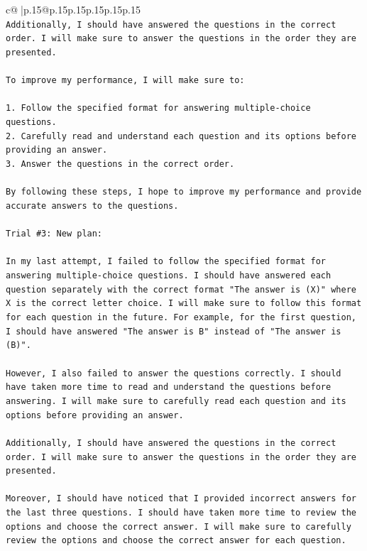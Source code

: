 \documentclass{article}
\begin{document}
{\begin{supertabular}{c@{$\;$}|p{.15\linewidth}@{}p{.15\linewidth}p{.15\linewidth}p{.15\linewidth}p{.15\linewidth}p{.15\linewidth}}
{{{\\ 
\texttt{Additionally, I should have answered the questions in the correct order. I will make sure to answer the questions in the order they are presented.} \\
\\ 
\texttt{To improve my performance, I will make sure to:} \\
\\ 
\texttt{1. Follow the specified format for answering multiple{-}choice questions.} \\
\texttt{2. Carefully read and understand each question and its options before providing an answer.} \\
\texttt{3. Answer the questions in the correct order.} \\
\\ 
\texttt{By following these steps, I hope to improve my performance and provide accurate answers to the questions.} \\
\\ 
\texttt{Trial \#3: New plan: } \\
\\ 
\texttt{In my last attempt, I failed to follow the specified format for answering multiple{-}choice questions. I should have answered each question separately with the correct format "The answer is (X)" where X is the correct letter choice. I will make sure to follow this format for each question in the future. For example, for the first question, I should have answered "The answer is B" instead of "The answer is (B)".} \\
\\ 
\texttt{However, I also failed to answer the questions correctly. I should have taken more time to read and understand the questions before answering. I will make sure to carefully read each question and its options before providing an answer.} \\
\\ 
\texttt{Additionally, I should have answered the questions in the correct order. I will make sure to answer the questions in the order they are presented.} \\
\\ 
\texttt{Moreover, I should have noticed that I provided incorrect answers for the last three questions. I should have taken more time to review the options and choose the correct answer. I will make sure to carefully review the options and choose the correct answer for each question.} \\
\\ 
}}}
\end{supertabular}}
\end{document}
